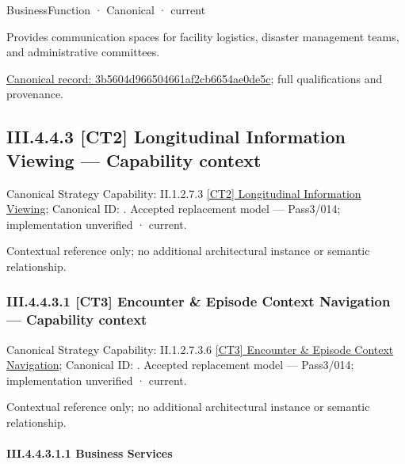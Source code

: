 \label{element:3b5604d966504661af2cb6654ae0de5c}
{\small BusinessFunction · Canonical · current}\par

Provides communication spaces for facility logistics, disaster management teams, and administrative committees.


{\footnotesize \href{../../../../continuum/business/business-function/3b5604d966504661af2cb6654ae0de5c.md}{Canonical record: 3b5604d966504661af2cb6654ae0de5c}; full qualifications and provenance.}\par
\subsection*{III.4.4.3 [CT2] Longitudinal Information Viewing — Capability context}
\label{navigation:III.4.4.3}

{\small Canonical Strategy Capability: II.1.2.7.3 \hyperref[element:b47f58042730497daf37e418ac865bb3]{[CT2] Longitudinal Information Viewing}; Canonical ID: \texttt{}. Accepted replacement model — Pass3/014; implementation unverified · current.}\par
Contextual reference only; no additional architectural instance or semantic relationship.\par
\subsubsection*{III.4.4.3.1 [CT3] Encounter \& Episode Context Navigation — Capability context}
\label{navigation:III.4.4.3.1}

{\small Canonical Strategy Capability: II.1.2.7.3.6 \hyperref[element:bfed62e152d742a3be947e824892064a]{[CT3] Encounter \& Episode Context Navigation}; Canonical ID: \texttt{}. Accepted replacement model — Pass3/014; implementation unverified · current.}\par
Contextual reference only; no additional architectural instance or semantic relationship.\par
\paragraph*{III.4.4.3.1.1 Business Services}
\label{navigation:III.4.4.3.1.1}

